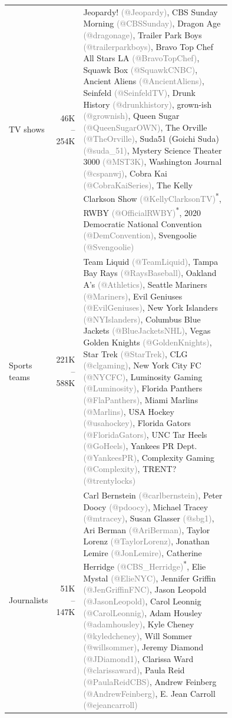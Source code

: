 \begin{tabular}{lrp{0.75\linewidth}}
TV shows & 46K -- 254K & Jeopardy! {\textcolor{gray}{(@Jeopardy)}}, CBS Sunday Morning {\textcolor{gray}{(@CBSSunday)}}, Dragon Age {\textcolor{gray}{(@dragonage)}}, Trailer Park Boys {\textcolor{gray}{(@trailerparkboys)}}, Bravo Top Chef All Stars LA {\textcolor{gray}{(@BravoTopChef)}}, Squawk Box {\textcolor{gray}{(@SquawkCNBC)}}, Ancient Aliens {\textcolor{gray}{(@AncientAliens)}}, Seinfeld {\textcolor{gray}{(@SeinfeldTV)}}, Drunk History {\textcolor{gray}{(@drunkhistory)}}, grown-ish {\textcolor{gray}{(@grownish)}}, Queen Sugar {\textcolor{gray}{(@QueenSugarOWN)}}, The Orville {\textcolor{gray}{(@TheOrville)}}, Suda51 (Goichi Suda) {\textcolor{gray}{(@suda\_51)}}, Mystery Science Theater 3000 {\textcolor{gray}{(@MST3K)}}, Washington Journal {\textcolor{gray}{(@cspanwj)}}, Cobra Kai {\textcolor{gray}{(@CobraKaiSeries)}}, The Kelly Clarkson Show {\textcolor{gray}{(@KellyClarksonTV)}}\textsuperscript{*}, RWBY {\textcolor{gray}{(@OfficialRWBY)}}\textsuperscript{*}, 2020 Democratic National Convention {\textcolor{gray}{(@DemConvention)}}, Svengoolie {\textcolor{gray}{(@Svengoolie)}} \\
Sports teams & 221K -- 588K & Team Liquid {\textcolor{gray}{(@TeamLiquid)}}, Tampa Bay Rays {\textcolor{gray}{(@RaysBaseball)}}, Oakland A's {\textcolor{gray}{(@Athletics)}}, Seattle Mariners {\textcolor{gray}{(@Mariners)}}, Evil Geniuses {\textcolor{gray}{(@EvilGeniuses)}}, New York Islanders {\textcolor{gray}{(@NYIslanders)}}, Columbus Blue Jackets {\textcolor{gray}{(@BlueJacketsNHL)}}, Vegas Golden Knights {\textcolor{gray}{(@GoldenKnights)}}, Star Trek {\textcolor{gray}{(@StarTrek)}}, CLG {\textcolor{gray}{(@clgaming)}}, New York City FC {\textcolor{gray}{(@NYCFC)}}, Luminosity Gaming {\textcolor{gray}{(@Luminosity)}}, Florida Panthers {\textcolor{gray}{(@FlaPanthers)}}, Miami Marlins {\textcolor{gray}{(@Marlins)}}, USA Hockey {\textcolor{gray}{(@usahockey)}}, Florida Gators {\textcolor{gray}{(@FloridaGators)}}, UNC Tar Heels {\textcolor{gray}{(@GoHeels)}}, Yankees PR Dept. {\textcolor{gray}{(@YankeesPR)}}, Complexity Gaming {\textcolor{gray}{(@Complexity)}}, TRENT? {\textcolor{gray}{(@trentylocks)}} \\
Journalists & 51K -- 147K & Carl Bernstein {\textcolor{gray}{(@carlbernstein)}}, Peter Doocy {\textcolor{gray}{(@pdoocy)}}, Michael Tracey {\textcolor{gray}{(@mtracey)}}, Susan Glasser {\textcolor{gray}{(@sbg1)}}, Ari Berman {\textcolor{gray}{(@AriBerman)}}, Taylor Lorenz {\textcolor{gray}{(@TaylorLorenz)}}, Jonathan Lemire {\textcolor{gray}{(@JonLemire)}}, Catherine Herridge {\textcolor{gray}{(@CBS\_Herridge)}}\textsuperscript{*}, Elie Mystal {\textcolor{gray}{(@ElieNYC)}}, Jennifer Griffin {\textcolor{gray}{(@JenGriffinFNC)}}, Jason Leopold {\textcolor{gray}{(@JasonLeopold)}}, Carol Leonnig {\textcolor{gray}{(@CarolLeonnig)}}, Adam Housley {\textcolor{gray}{(@adamhousley)}}, Kyle Cheney {\textcolor{gray}{(@kyledcheney)}}, Will Sommer {\textcolor{gray}{(@willsommer)}}, Jeremy Diamond {\textcolor{gray}{(@JDiamond1)}}, Clarissa Ward {\textcolor{gray}{(@clarissaward)}}, Paula Reid {\textcolor{gray}{(@PaulaReidCBS)}}, Andrew Feinberg {\textcolor{gray}{(@AndrewFeinberg)}}, E. Jean Carroll {\textcolor{gray}{(@ejeancarroll)}} \\
\bottomrule
\end{tabular}
